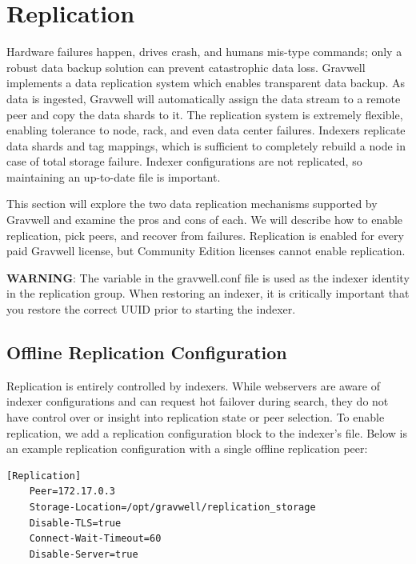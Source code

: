 {{\section{Replication}
Hardware failures happen, drives crash, and humans mis-type commands;
only a robust data backup solution can prevent catastrophic data loss.
Gravwell implements a data replication system which enables transparent
data backup. As data is ingested, Gravwell will automatically assign
the data stream to a remote peer and copy the data shards to it. The
replication system is extremely flexible, enabling tolerance to node,
rack, and even data center failures. Indexers replicate data shards and
tag mappings, which is sufficient to completely rebuild a node in case
of total storage failure. Indexer configurations are not replicated, so
maintaining an up-to-date  file is important.}

This section will explore the two data replication mechanisms supported
by Gravwell and examine the pros and cons of each. We will describe how
to enable replication, pick peers, and recover from failures.
Replication is enabled for every paid Gravwell license, but Community
Edition licenses cannot enable replication.

\textbf{WARNING}: The  variable in the gravwell.conf file is
used as the indexer identity in the replication group. When restoring
an indexer, it is critically important that you restore the correct UUID
prior to starting the indexer.

\subsection{Offline Replication Configuration}

Replication is entirely controlled by indexers. While webservers are
aware of indexer configurations and can request hot failover during
search, they do not have control over or insight into replication state
or peer selection. To enable replication, we add a replication
configuration block to the indexer's  file. Below is
an example replication configuration with a single offline replication
peer:

\begin{Verbatim}[breaklines=true]
[Replication]
    Peer=172.17.0.3
    Storage-Location=/opt/gravwell/replication_storage
    Disable-TLS=true
    Connect-Wait-Timeout=60
    Disable-Server=true
\end{Verbatim}

}
